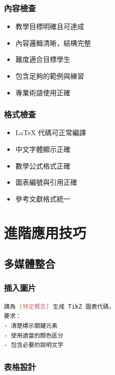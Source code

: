 \documentclass[12pt,a4paper]{article}
\begin{document}
\subsubsection{內容檢查}
\begin{itemize}
    \item[$\square$] 教學目標明確且可達成
    \item[$\square$] 內容邏輯清晰，結構完整
    \item[$\square$] 難度適合目標學生
    \item[$\square$] 包含足夠的範例與練習
    \item[$\square$] 專業術語使用正確
\end{itemize}

\subsubsection{格式檢查}
\begin{itemize}
    \item[$\square$] LaTeX 代碼可正常編譯
    \item[$\square$] 中文字體顯示正確
    \item[$\square$] 數學公式格式正確
    \item[$\square$] 圖表編號與引用正確
    \item[$\square$] 參考文獻格式統一
\end{itemize}

\section{進階應用技巧}

\subsection{多媒體整合}

\subsubsection{插入圖片}

\begin{lstlisting}[language=bash]
請為 [特定概念] 生成 TikZ 圖表代碼，
要求：
- 清楚標示關鍵元素
- 使用適當的顏色區分
- 包含必要的說明文字
\end{lstlisting}

\subsubsection{表格設計}
\end{document}
